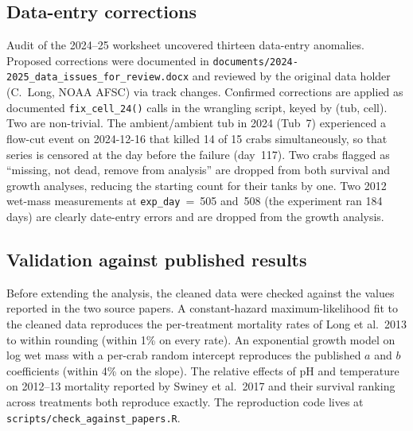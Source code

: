 \documentclass[11pt]{article}
\begin{document}
\subsection{Data-entry corrections}
Audit of the 2024--25 worksheet uncovered thirteen data-entry anomalies. Proposed corrections were documented in \texttt{documents/2024-2025\_data\_issues\_for\_review.docx} and reviewed by the original data holder (C.\ Long, NOAA AFSC) via track changes. Confirmed corrections are applied as documented \texttt{fix\_cell\_24()} calls in the wrangling script, keyed by (tub, cell). Two are non-trivial. The ambient/ambient tub in 2024 (Tub~7) experienced a flow-cut event on 2024-12-16 that killed 14 of 15 crabs simultaneously, so that series is censored at the day before the failure (day~117). Two crabs flagged as ``missing, not dead, remove from analysis'' are dropped from both survival and growth analyses, reducing the starting count for their tanks by one. Two 2012 wet-mass measurements at \texttt{exp\_day}~=~505 and~508 (the experiment ran 184 days) are clearly date-entry errors and are dropped from the growth analysis.

\subsection{Validation against published results}
Before extending the analysis, the cleaned data were checked against the values reported in the two source papers. A constant-hazard maximum-likelihood fit to the cleaned data reproduces the per-treatment mortality rates of Long et al.\ 2013 to within rounding (within 1\% on every rate). An exponential growth model on log wet mass with a per-crab random intercept reproduces the published $a$ and $b$ coefficients (within 4\% on the slope). The relative effects of pH and temperature on 2012--13 mortality reported by Swiney et al.\ 2017 and their survival ranking across treatments both reproduce exactly. The reproduction code lives at \texttt{scripts/check\_against\_papers.R}.
\end{document}
